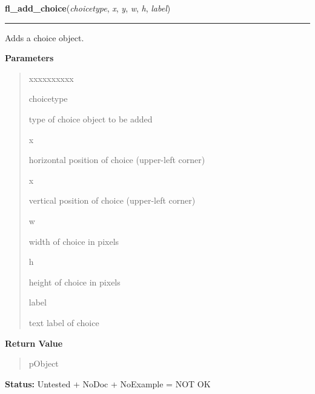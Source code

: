     \label{xformslib:library:fl_add_choice}

    \vspace{0.5ex}

\hspace{.8\funcindent}\begin{boxedminipage}{\funcwidth}

    \raggedright \textbf{fl\_add\_choice}(\textit{choicetype}, \textit{x}, \textit{y}, \textit{w}, \textit{h}, \textit{label})

    \vspace{-1.5ex}

    \rule{\textwidth}{0.5\fboxrule}
\setlength{\parskip}{2ex}
    Adds a choice object.

\setlength{\parskip}{1ex}
      \textbf{Parameters}
      \vspace{-1ex}

      \begin{quote}
        \begin{Ventry}{xxxxxxxxxx}

          \item[choicetype]

          type of choice object to be added

          \item[x]

          horizontal position of choice (upper-left corner)

          \item[x]

          vertical position of choice (upper-left corner)

          \item[w]

          width of choice in pixels

          \item[h]

          height of choice in pixels

          \item[label]

          text label of choice

        \end{Ventry}

      \end{quote}

      \textbf{Return Value}
    \vspace{-1ex}

      \begin{quote}
      pObject

      \end{quote}

\textbf{Status:} Untested + NoDoc + NoExample = NOT OK



    \end{boxedminipage}

